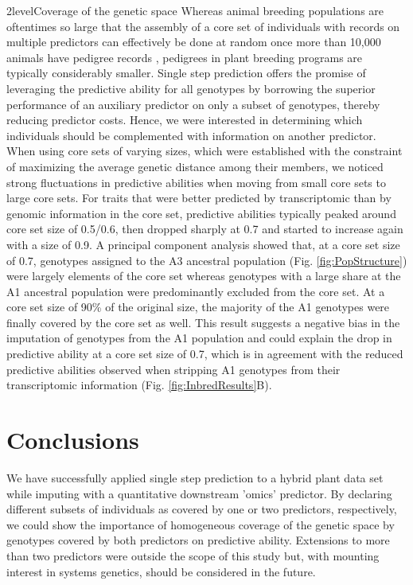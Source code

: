 \documentclass[12pt,titlepage]{article}
\begin{document}
\Genetics2level{Coverage of the genetic space}
Whereas animal breeding populations are oftentimes so large that the assembly 
of a core set of individuals with records on multiple predictors can effectively 
be done at random once more than 10,000 animals have pedigree records 
\cite{Fragomeni2015,Lourenco2015,Masuda2016}, pedigrees in plant breeding 
programs are typically considerably smaller.
Single step prediction offers the promise of leveraging the predictive ability
for all genotypes by borrowing the superior performance of an auxiliary
predictor on only a subset of genotypes, thereby reducing predictor costs.
Hence, we were interested in determining which individuals should be 
complemented with information on another predictor.
When using core sets of varying sizes, which were established with the
constraint of maximizing the average genetic distance among their members, we
noticed strong fluctuations in predictive abilities when moving from small core
sets to large core sets.
For traits that were better predicted by transcriptomic than by genomic
information in the core set, predictive abilities typically peaked around
core set size of 0.5/0.6, then dropped sharply at 0.7 and started to increase
again with a size of 0.9.
A principal component analysis showed that, at a core set size of 0.7, 
genotypes assigned to the A3 ancestral population (Fig. \ref{fig:PopStructure})
were largely elements of the core set whereas genotypes with a large share at 
the A1 ancestral population were predominantly excluded from the core set.
At a core set size of 90\% of the original size, the majority of the A1
genotypes were finally covered by the core set as well.
This result suggests a negative bias in the imputation of genotypes from the A1
population and could explain the drop in predictive ability at a core set size
of 0.7, which is in agreement with the reduced predictive abilities observed
when stripping A1 genotypes from their transcriptomic information (Fig.
\ref{fig:InbredResults}B).



\section*{Conclusions}
We have successfully applied single step prediction to a hybrid plant data set 
while imputing with a quantitative downstream 'omics' predictor.
By declaring different subsets of individuals as covered by one or two 
predictors, respectively, we could show the importance of homogeneous coverage
of the genetic space by genotypes covered by both predictors on predictive
ability.
Extensions to more than two predictors were outside the scope of this study
but, with mounting interest in systems genetics, should be considered in the
future.
\end{document}
